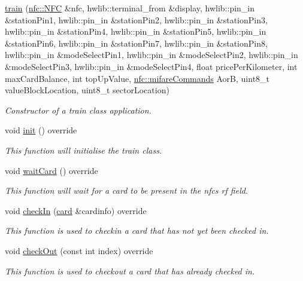 \begin{DoxyCompactItemize}
\item 
\hyperlink{classtrain_ae6db22b1f686e5a4a65434a4a7157643}{train} (\hyperlink{classnfc_1_1NFC}{nfc\+::\+N\+FC} \&nfc, hwlib\+::terminal\+\_\+from \&display, hwlib\+::pin\+\_\+in \&station\+Pin1, hwlib\+::pin\+\_\+in \&station\+Pin2, hwlib\+::pin\+\_\+in \&station\+Pin3, hwlib\+::pin\+\_\+in \&station\+Pin4, hwlib\+::pin\+\_\+in \&station\+Pin5, hwlib\+::pin\+\_\+in \&station\+Pin6, hwlib\+::pin\+\_\+in \&station\+Pin7, hwlib\+::pin\+\_\+in \&station\+Pin8, hwlib\+::pin\+\_\+in \&mode\+Select\+Pin1, hwlib\+::pin\+\_\+in \&mode\+Select\+Pin2, hwlib\+::pin\+\_\+in \&mode\+Select\+Pin3, hwlib\+::pin\+\_\+in \&mode\+Select\+Pin4, float price\+Per\+Kilometer, int max\+Card\+Balance, int top\+Up\+Value, \hyperlink{declarations_8h_a305b1a3bcfca65e2a82f0f9d24676835}{nfc\+::mifare\+Commands} AorB, uint8\+\_\+t value\+Block\+Location, uint8\+\_\+t sector\+Location)
\begin{DoxyCompactList}\small\item\em Constructor of a train class application. \end{DoxyCompactList}\item 
void \hyperlink{classtrain_a52db26884bf0f979ad55ce92f3d2f159}{init} () override
\begin{DoxyCompactList}\small\item\em This function will initialise the train class. \end{DoxyCompactList}\item 
void \hyperlink{classtrain_a4509fc35ff69717aab2636dd847981d4}{wait\+Card} () override
\begin{DoxyCompactList}\small\item\em This function will wait for a card to be present in the nfc\textquotesingle{}s rf field. \end{DoxyCompactList}\item 
void \hyperlink{classtrain_a1e0e594fdafed4ac60b5b6d81b91c2ca}{check\+In} (\hyperlink{classcard}{card} \&cardinfo) override
\begin{DoxyCompactList}\small\item\em This function is used to checkin a card that has not yet been checked in. \end{DoxyCompactList}\item 
void \hyperlink{classtrain_ae631814ed393394a525646ada78e1994}{check\+Out} (const int index) override
\begin{DoxyCompactList}\small\item\em This function is used to checkout a card that has already checked in. \end{DoxyCompactList}\item 

\end{DoxyCompactItemize}
